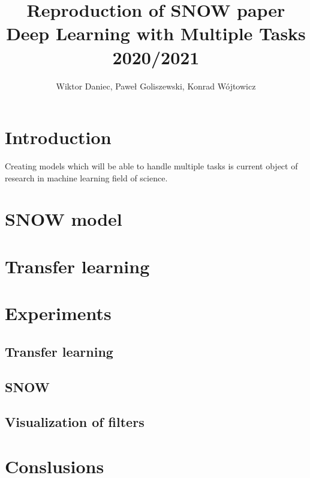 \documentclass[12pt]{article}
\begin{document}
\title{Reproduction of SNOW paper \\ \vspace{5mm} \large Deep Learning with Multiple Tasks 2020/2021}
\author{Wiktor Daniec, Paweł Goliszewski, Konrad Wójtowicz}

\maketitle
\section{Introduction}

Creating models which will be able to handle multiple tasks is current object of research in machine learning field of science. 

\section{SNOW model}

\section{Transfer learning}

\section{Experiments}
\subsection{Transfer learning}
\subsection{SNOW}
\subsection{Visualization of filters}

\section{Conslusions}

\begin{thebibliography}{99}
\end{thebibliography}
\end{document}
